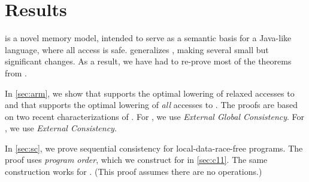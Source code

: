 \section{\PwTmcaTITLE{} Results}
\label{sec:results}

\PwP{} \cite{DBLP:journals/pacmpl/JagadeesanJR20} is a novel memory model,
intended to serve as a semantic basis for a Java-like language, where all
access is safe.  \PwTmca{} generalizes \PwP{}, making several small but
significant changes.  As a result, we have had to re-prove most of the
theorems from \PwP{}.

In \textsection\ref{sec:arm}, we show that  supports the optimal
lowering of relaxed accesses to \armeight{} and that  supports the
optimal lowering of \emph{all} accesses to \armeight{}.  The proofs are based
on two recent characterizations of \armeight{} \cite{armed}.  For ,
we use \emph{External Global Consistency}.  For , we use
\emph{External Consistency}.

In \textsection\ref{sec:sc}, we prove sequential consistency for
local-data-race-free programs.  The proof uses \emph{program order}, which we
construct for \cXI{} in \textsection\ref{sec:c11}.  The same construction
works for \PwTmca{}.  (This proof assumes there are no \RMW{} operations.)

